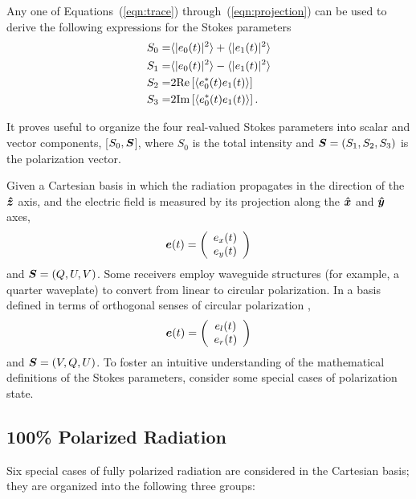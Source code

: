 \documentclass[twocolumn]{aastex6}
\newcommand{\mbf}[1]{\mbox{\boldmath $#1$}}
\newcommand{\Eqns}[3]{Equations~(\ref{eqn:#1}) #2~(\ref{eqn:#3})}
\newcommand{\real}{{\rm Re}}
\newcommand{\imag}{{\rm Im}}
\newcommand{\re}[1]{\real\ensuremath{ \left[ {#1} \right] }}
\newcommand{\im}[1]{\imag\ensuremath{ \left[ {#1} \right] }}
\begin{document}
Any one of \Eqns{trace}{through}{projection} can be used to
derive the following expressions for the Stokes parameters 
\begin{eqnarray}
 S_0=&\langle|e_0(t)|^2\rangle+\langle|e_1(t)|^2\rangle\label{eqn:stokesI} \\
 S_1=&\langle|e_0(t)|^2\rangle-\langle|e_1(t)|^2\rangle\label{eqn:stokesQ} \\
 S_2=&2\re{\langle e_0^*(t)e_1(t)\rangle}\label{eqn:stokesU} \\
 S_3=&2\im{\langle e_0^*(t)e_1(t)\rangle}.\label{eqn:stokesV}
\end{eqnarray}

It proves useful to organize the four real-valued 
Stokes parameters into scalar and vector components,
[$S_0,\mbf{S}$], where $S_0$ is the total intensity and
$\mbf{S}=(S_1,S_2,S_3)$ is the polarization vector.

Given a Cartesian basis in which the radiation propagates in the
direction of the $\mbf{\hat z}$ axis, and the electric field is
measured by its projection along the $\mbf{\hat x}$ and $\mbf{\hat y}$
axes,
\begin{equation}
\mbf{e}(t) =
 \left( 
    \begin{array}{c}
      e_x(t) \\
      e_y(t)
    \end{array}
  \right)
\end{equation}
and $\mbf{S}=(Q,U,V)$.
%
Some receivers employ waveguide structures (for example, a quarter
waveplate) to convert from linear to circular polarization.
In a basis defined in terms of orthogonal senses of circular
polarization \citep[e.g.\ see][for more details]{vmjr10},
\begin{equation}
\mbf{e}(t) =
 \left( 
    \begin{array}{c}
      e_l(t) \\
      e_r(t)
    \end{array}
  \right)
\end{equation}
%
and $\mbf{S}=(V,Q,U)$. To foster an intuitive understanding of the
mathematical definitions of the Stokes parameters, consider some
special cases of polarization state.

\subsection{ 100\% Polarized Radiation }

Six special cases of fully polarized radiation are considered in the
Cartesian basis; they are organized into the following three groups:
\end{document}
